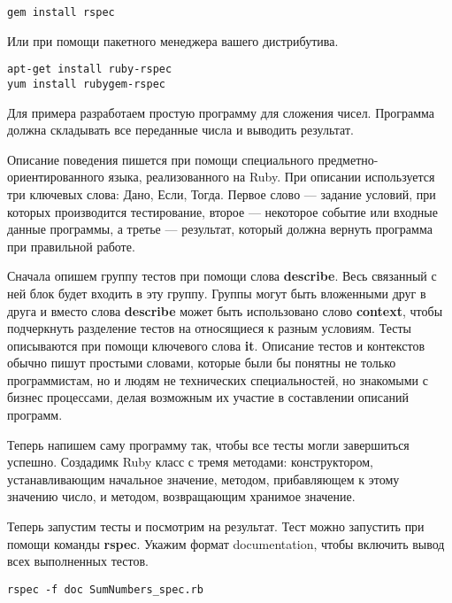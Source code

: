 \begin{verbatim}
gem install rspec
\end{verbatim}

Или при помощи пакетного менеджера вашего дистрибутива.

\begin{verbatim}
apt-get install ruby-rspec
yum install rubygem-rspec
\end{verbatim}

Для примера разработаем простую программу для сложения чисел. Программа должна складывать все переданные числа и выводить результат.

Описание поведения пишется при помощи специального предметно-ориентированного языка, реализованного на Ruby. При описании используется три ключевых слова: Дано, Если, Тогда. Первое слово --- задание условий, при которых производится тестирование, второе --- некоторое событие или входные данные программы, а третье --- результат, который должна вернуть программа при правильной работе.

Сначала опишем группу тестов при помощи слова \textbf{describe}. Весь связанный с ней блок будет входить в эту группу. Группы могут быть вложенными друг в друга и вместо слова \textbf{describe} может быть использовано слово \textbf{context}, чтобы подчеркнуть разделение тестов на относящиеся к разным условиям. Тесты описываются при помощи ключевого слова \textbf{it}. Описание тестов и контекстов обычно пишут простыми словами, которые были бы понятны не только программистам, но и людям не технических специальностей, но знакомыми с бизнес процессами, делая возможным их участие в составлении описаний программ.



Теперь напишем саму программу так, чтобы все тесты могли завершиться успешно. Создадимк Ruby класс с тремя методами: конструктором, устанавливающим начальное значение, методом, прибавляющем к этому значению число, и методом, возвращающим хранимое значение.



Теперь запустим тесты и посмотрим на результат. Тест можно запустить при помощи команды \textbf{rspec}. Укажим формат documentation, чтобы включить вывод всех выполненных тестов.

\begin{verbatim}
rspec -f doc SumNumbers_spec.rb
\end{verbatim}

